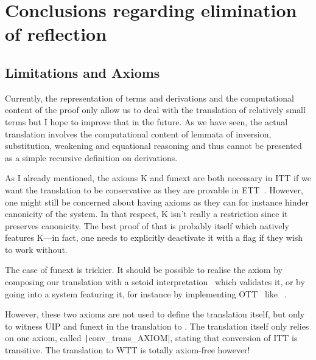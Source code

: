 \chapter{Conclusions regarding elimination of reflection}

\section{Limitations and Axioms}
\label{sec:axioms}

Currently, the representation of terms and derivations and the
computational content of the proof only allow us to deal with the
translation of relatively small terms but I hope to improve that in
the future. As we have seen, the actual translation involves the
computational content of lemmata of inversion, substitution, weakening
and equational reasoning and thus cannot be presented as a simple
recursive definition on derivations.


As I already mentioned, the axioms K and \acrshort{funext} are both
necessary in \acrshort{ITT} if we want the translation to be conservative as
they are provable in \acrshort{ETT}~.
However, one might still be concerned about having axioms
as they can for instance hinder canonicity of the system.
In that respect, K isn't really a restriction since it preserves canonicity.
The best proof of that is probably \Agda itself which natively features K---in
fact, one needs to explicitly deactivate it with a flag if they wish to work
without.

The case of \acrshort{funext} is trickier. It should be possible to realise
the axiom by composing our translation with a setoid
interpretation~ which validates it, or by going into a
system featuring it, for instance by implementing
\acrlong{OTT}~ like
\Epigram~.

However, these two axioms are not used to define the translation itself,
but only to witness \acrshort{UIP} and \acrlong{funext} in the translation to
\Coq.
The translation itself only relies on one axiom, called
\texttt|conv_trans_AXIOM|, stating that conversion
of \acrshort{ITT} is transitive.
The translation to \acrshort{WTT} is totally axiom-free however!

